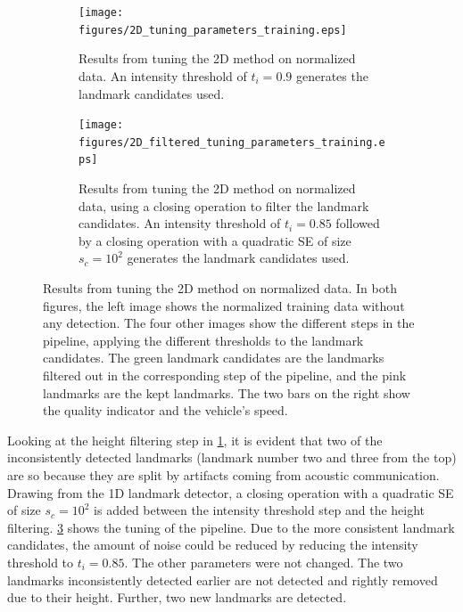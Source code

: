 \begin{figure} %
     \centering
    \begin{subfigure}[t]{0.975\textwidth}
        \centering
        \texttt{[image: figures/2D\_tuning\_parameters\_training.eps]}
        \caption{Results from tuning the 2D method on normalized data. An intensity threshold of $t_i = 0.9$ generates the landmark candidates used.}
        \label{fig:2d_tuning_paramaters_training}
     \end{subfigure}
     \hfill
     \begin{subfigure}[b]{0.975\textwidth}
        \texttt{[image: figures/2D\_filtered\_tuning\_parameters\_training.eps]}
        \caption{Results from tuning the 2D method on normalized data, using a closing operation to filter the landmark candidates. An intensity threshold of $t_i = 0.85$ followed by a closing operation with a quadratic SE of size $s_c = 10^2$ generates the landmark candidates used.}
        \label{fig:2d_tuning_paramaters_w_filtering_training}
     \end{subfigure}
        \caption{Results from tuning the 2D method on normalized data. In both figures, the left image shows the normalized training data without any detection. The four other images show the different steps in the pipeline, applying the different thresholds to the landmark candidates. The green landmark candidates are the landmarks filtered out in the corresponding step of the pipeline, and the pink landmarks are the kept landmarks. The two bars on the right show the quality indicator and the vehicle's speed.}
\end{figure}

Looking at the height filtering step in \cref{fig:2d_tuning_paramaters_training}, it is evident that two of the inconsistently detected landmarks (landmark number two and three from the top) are so because they are split by artifacts coming from acoustic communication. Drawing from the 1D landmark detector, a closing operation with a quadratic SE of size $s_c = 10^2$ is added between the intensity threshold step and the height filtering. \cref{fig:2d_tuning_paramaters_w_filtering_training} shows the tuning of the pipeline. Due to the more consistent landmark candidates, the amount of noise could be reduced by reducing the intensity threshold to $t_i = 0.85$. The other parameters were not changed. The two landmarks inconsistently detected earlier are not detected and rightly removed due to their height. Further, two new landmarks are detected. 

